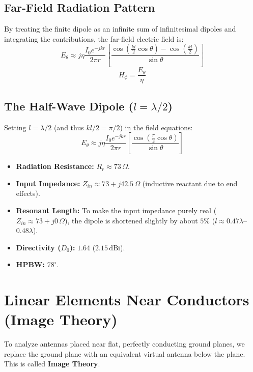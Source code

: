\documentclass[12pt,a4paper]{article}
\begin{document}
\subsection{Far-Field Radiation Pattern}
By treating the finite dipole as an infinite sum of infinitesimal dipoles and integrating the contributions, the far-field electric field is:
\[
E_\theta \approx j \eta \frac{I_0 e^{-jkr}}{2\pi r} \left[ \frac{\cos\left(\frac{kl}{2}\cos\theta\right) - \cos\left(\frac{kl}{2}\right)}{\sin\theta} \right]
\]
\[
H_\phi = \frac{E_\theta}{\eta}
\]

\subsection{The Half-Wave Dipole (\texorpdfstring{$l = \lambda/2$}{l = lambda/2})}
Setting $l = \lambda/2$ (and thus $kl/2 = \pi/2$) in the field equations:
\[
E_\theta \approx j \eta \frac{I_0 e^{-jkr}}{2\pi r} \left[ \frac{\cos\left(\frac{\pi}{2}\cos\theta\right)}{\sin\theta} \right]
\]
\begin{itemize}[leftmargin=*, itemsep=3pt]
  \item \textbf{Radiation Resistance:} $R_r \approx 73\,\Omega$.
  \item \textbf{Input Impedance:} $Z_{in} \approx 73 + j 42.5\,\Omega$ (inductive reactant due to end effects).
  \item \textbf{Resonant Length:} To make the input impedance purely real ($Z_{in} \approx 73 + j0\,\Omega$), the dipole is shortened slightly by about $5\%$ ($l \approx 0.47\lambda$–$0.48\lambda$).
  \item \textbf{Directivity ($D_0$):} $1.64$ ($2.15\,\text{dBi}$).
  \item \textbf{HPBW:} $78^\circ$.
\end{itemize}

\section{Linear Elements Near Conductors (Image Theory)}

To analyze antennas placed near flat, perfectly conducting ground planes, we replace the ground plane with an equivalent virtual antenna below the plane. This is called \textbf{Image Theory}.
\end{document}
